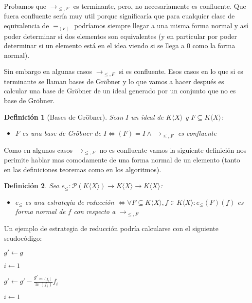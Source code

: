 \documentclass{report}
\theoremstyle{customstyle}
\newtheorem{definition}{Definición}[chapter]
\theoremstyle{factstyle}
\DeclareMathOperator{\sop}{sop}
\DeclareMathOperator{\lm}{lm}
\DeclareMathOperator{\lc}{lc}
\begin{document}
Probamos que $→_{≤, F}$ es terminante, pero, no necesariamente es confluente. Que fuera confluente sería muy util porque significaría que para cualquier clase de equivalencia de $≡_{(F)}$ podríamos siempre llegar a una misma forma normal y así poder determinar si dos elementos son equivalentes (y en particular por poder determinar si un elemento está en el idea viendo si se llega a $0$ como la forma normal).

Sin embargo en algunas casos $→_{≤, F}$ si es confluente. Esos casos en lo que si es terminante se llaman bases de Gröbner y lo que vamos a hacer después es calcular una base de Gröbner de un ideal generado por un conjunto que no es base de Gröbner.

\begin{definition}[Bases de Gröbner]\label{def:base de Gröbner}
  Sean $I$ un ideal de $K⟨X⟩$ y $F ⊆ K⟨X⟩$:
  \begin{itemize}
    \item $F$ es una base de Gröbner de $I ⇔ (F) = I ∧ →_{≤, F}$ es confluente
  \end{itemize}
\end{definition}

Como en algunos casos $→_{≤, F}$ no es confluente vamos la siguiente definición nos perimite hablar mas comodamente de una forma normal de un elemento (tanto en las definiciones teoremas como en los algoritmos).

\begin{definition}
  Sea $e_≤ : 𝒫(K⟨X⟩) → K⟨X⟩ → K⟨X⟩$:
  \begin{itemize}
    \item $e_≤$ es una estrategia de reducción $⇔ ∀F ⊆ K⟨X⟩, f ∈ K⟨X⟩ : e_≤(F)(f)$ es forma normal de $f$ con respecto a $→_{≤, F}$
  \end{itemize}
\end{definition}

Un ejemplo de estrategia de reducción podría calcularse con el siguiente seudocódigo:

\begin{algorithm}[H] %
  \caption{Ejemplo de estrategia de reducción}\label{alg:estrategia de reducción}
  $g' ← g$

  $i ← 1$

   {
     {
      \If{$f_i ∈ \sop(g')$} {
        $g' ← g' - \frac{g'_{\lm(f_i)}}{\lc(f_i)}f_i$

        $i ← 1$

        \Break
      }
    }
  }
\end{algorithm}
\end{document}
